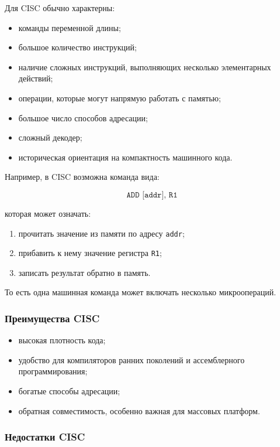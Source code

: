 \documentclass[12pt,a4paper]{article}
\begin{document}
Для CISC обычно характерны:

\begin{itemize}
    \item команды переменной длины;
    \item большое количество инструкций;
    \item наличие сложных инструкций, выполняющих несколько элементарных действий;
    \item операции, которые могут напрямую работать с памятью;
    \item большое число способов адресации;
    \item сложный декодер;
    \item историческая ориентация на компактность машинного кода.
\end{itemize}

Например, в CISC возможна команда вида:

\[
    \texttt{ADD [addr], R1}
\]

которая может означать:

\begin{enumerate}
    \item прочитать значение из памяти по адресу \texttt{addr};
    \item прибавить к нему значение регистра \texttt{R1};
    \item записать результат обратно в память.
\end{enumerate}

То есть одна машинная команда может включать несколько микроопераций.

\subsubsection{Преимущества CISC}

\begin{itemize}
    \item высокая плотность кода;
    \item удобство для компиляторов ранних поколений и ассемблерного программирования;
    \item богатые способы адресации;
    \item обратная совместимость, особенно важная для массовых платформ.
\end{itemize}

\subsubsection{Недостатки CISC}
\end{document}
